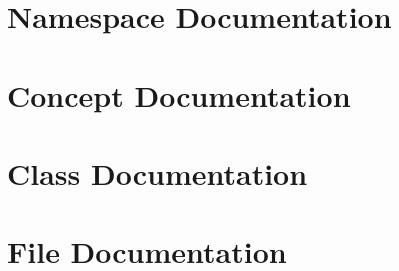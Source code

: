 \documentclass[twoside]{book}
\newcommand{\+}{\discretionary{\mbox{\scriptsize$\hookleftarrow$}}{}{}}
\newcommand{\clearemptydoublepage}{%
    \newpage{\pagestyle{empty}\cleardoublepage}%
  }
\begin{document}
\chapter{Namespace Documentation}




\chapter{Concept Documentation}

\chapter{Class Documentation}






\chapter{File Documentation}



  \backmatter
  \newpage
  \clearemptydoublepage
  \printindex
\end{document}
